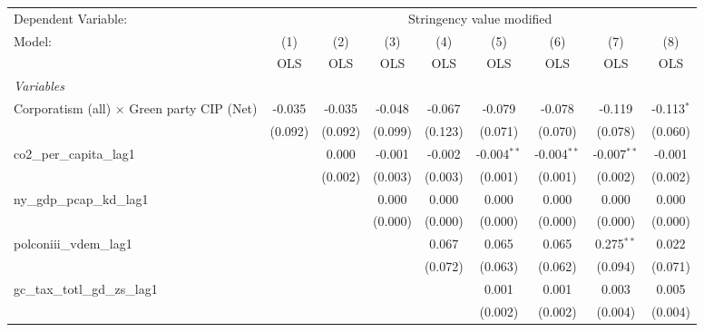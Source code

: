 
\begingroup
\centering
\begin{tabular}{lcccccccc}
   \toprule
   Dependent Variable: & \multicolumn{8}{c}{Stringency value modified}\\
   Model:                                            & (1)     & (2)     & (3)     & (4)     & (5)           & (6)           & (7)           & (8)\\  
                                                     &  OLS    & OLS     & OLS     & OLS     & OLS           & OLS           & OLS           & OLS\\  
   \midrule
   \emph{Variables}\\
   Corporatism (all) $\times$ Green party CIP (Net)  & -0.035  & -0.035  & -0.048  & -0.067  & -0.079        & -0.078        & -0.119        & -0.113$^{*}$\\   
                                                     & (0.092) & (0.092) & (0.099) & (0.123) & (0.071)       & (0.070)       & (0.078)       & (0.060)\\   
   co2\_per\_capita\_lag1                            &         & 0.000   & -0.001  & -0.002  & -0.004$^{**}$ & -0.004$^{**}$ & -0.007$^{**}$ & -0.001\\   
                                                     &         & (0.002) & (0.003) & (0.003) & (0.001)       & (0.001)       & (0.002)       & (0.002)\\   
   ny\_gdp\_pcap\_kd\_lag1                           &         &         & 0.000   & 0.000   & 0.000         & 0.000         & 0.000         & 0.000\\   
                                                     &         &         & (0.000) & (0.000) & (0.000)       & (0.000)       & (0.000)       & (0.000)\\   
   polconiii\_vdem\_lag1                             &         &         &         & 0.067   & 0.065         & 0.065         & 0.275$^{**}$  & 0.022\\   
                                                     &         &         &         & (0.072) & (0.063)       & (0.062)       & (0.094)       & (0.071)\\   
   gc\_tax\_totl\_gd\_zs\_lag1                       &         &         &         &         & 0.001         & 0.001         & 0.003         & 0.005\\   
                                                     &         &         &         &         & (0.002)       & (0.002)       & (0.004)       & (0.004)\\   

\end{tabular}
